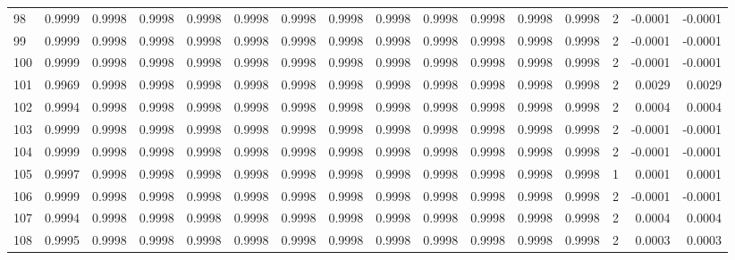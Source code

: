 \begin{tabular}{lrrrrrrrrrrrrrrr}
98  &      0.9999 &  0.9998 &  0.9998 &  0.9998 &  0.9998 &  0.9998 &  0.9998 &  0.9998 &  0.9998 &  0.9998 &   0.9998 &     0.9998 &      2 &                   -0.0001 &                    -0.0001 \\
99  &      0.9999 &  0.9998 &  0.9998 &  0.9998 &  0.9998 &  0.9998 &  0.9998 &  0.9998 &  0.9998 &  0.9998 &   0.9998 &     0.9998 &      2 &                   -0.0001 &                    -0.0001 \\
100 &      0.9999 &  0.9998 &  0.9998 &  0.9998 &  0.9998 &  0.9998 &  0.9998 &  0.9998 &  0.9998 &  0.9998 &   0.9998 &     0.9998 &      2 &                   -0.0001 &                    -0.0001 \\
101 &      0.9969 &  0.9998 &  0.9998 &  0.9998 &  0.9998 &  0.9998 &  0.9998 &  0.9998 &  0.9998 &  0.9998 &   0.9998 &     0.9998 &      2 &                    0.0029 &                     0.0029 \\
102 &      0.9994 &  0.9998 &  0.9998 &  0.9998 &  0.9998 &  0.9998 &  0.9998 &  0.9998 &  0.9998 &  0.9998 &   0.9998 &     0.9998 &      2 &                    0.0004 &                     0.0004 \\
103 &      0.9999 &  0.9998 &  0.9998 &  0.9998 &  0.9998 &  0.9998 &  0.9998 &  0.9998 &  0.9998 &  0.9998 &   0.9998 &     0.9998 &      2 &                   -0.0001 &                    -0.0001 \\
104 &      0.9999 &  0.9998 &  0.9998 &  0.9998 &  0.9998 &  0.9998 &  0.9998 &  0.9998 &  0.9998 &  0.9998 &   0.9998 &     0.9998 &      2 &                   -0.0001 &                    -0.0001 \\
105 &      0.9997 &  0.9998 &  0.9998 &  0.9998 &  0.9998 &  0.9998 &  0.9998 &  0.9998 &  0.9998 &  0.9998 &   0.9998 &     0.9998 &      1 &                    0.0001 &                     0.0001 \\
106 &      0.9999 &  0.9998 &  0.9998 &  0.9998 &  0.9998 &  0.9998 &  0.9998 &  0.9998 &  0.9998 &  0.9998 &   0.9998 &     0.9998 &      2 &                   -0.0001 &                    -0.0001 \\
107 &      0.9994 &  0.9998 &  0.9998 &  0.9998 &  0.9998 &  0.9998 &  0.9998 &  0.9998 &  0.9998 &  0.9998 &   0.9998 &     0.9998 &      2 &                    0.0004 &                     0.0004 \\
108 &      0.9995 &  0.9998 &  0.9998 &  0.9998 &  0.9998 &  0.9998 &  0.9998 &  0.9998 &  0.9998 &  0.9998 &   0.9998 &     0.9998 &      2 &                    0.0003 &                     0.0003 \\

\end{tabular}
